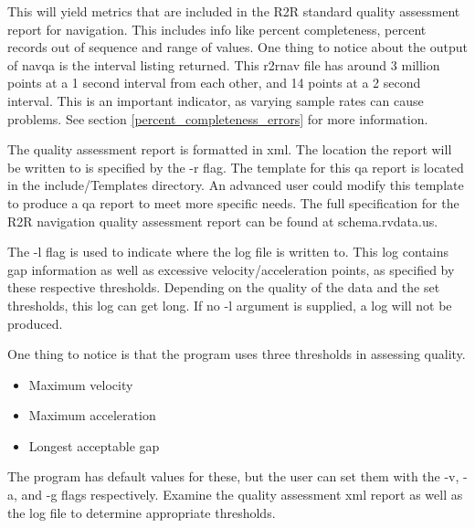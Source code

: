 \documentclass{article}
\begin{document}
This will yield metrics that are included in the R2R standard quality assessment report for navigation.  This includes info like percent completeness, percent records out of sequence and range of values.  One thing to notice about the output of navqa is the interval listing returned.  This r2rnav file has around 3 million points at a 1 second interval from each other, and 14 points at a 2 second interval.  This is an important indicator, as varying sample rates can cause problems.  See section \ref{percent_completeness_errors} for more information.

The quality assessment report is formatted in xml.   The location the report will be written to is specified by the -r flag.  The template for this qa report is located in the include/Templates directory.  An advanced user could modify this template to produce a qa report to meet more specific needs.  The full specification for the R2R navigation quality assessment report can be found at schema.rvdata.us.

The -l flag is used to indicate where the log file is written to.  This log contains gap information as well as excessive velocity/acceleration points, as specified by these respective thresholds.  Depending on the quality of the data and the set thresholds, this log can get long.  If no -l argument is supplied, a log will not be produced.


One thing to notice is that the program uses three thresholds in assessing quality.

			\begin{itemize}
				\item Maximum velocity
				\item Maximum acceleration
				\item Longest acceptable gap
			\end{itemize}
			

The program has default values for these, but the user can set them with the -v, -a, and -g flags respectively.  Examine the quality assessment xml report as well as the log file to determine appropriate thresholds.
	
\end{document}
